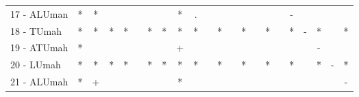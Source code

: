 \begin{table}[h]
\begin{center}
\begin{tabular}{lcc|cc|cc|cc|cc|cc|cc|cc|cc|cc|c}
17 - ALUman	& * & * &   &   &   &   &   & * & . &   &   &   &   &   &   &   & - &   &   &   &   \\
18 - TUmah	& * & * & * & * &   & * & * & * & * &   & * &   & * &   & * &   & * & - & * &   & * \\ \hline
19 - ATUmah	& * &   &   &   &   &   &   & + &   &   &   &   &   &   &   &   &   &   & - &   &   \\
20 - LUmah	& * & * & * & * &   & * & * & * & * &   & * &   & * &   & * &   & * &   & * & - & * \\ \hline
21 - ALUmah	& * & + &   &   &   &   &   & * &   &   &   &   &   &   &   &   &   &   &   &   & - \\\end{tabular}
\label{stratsALCKappaFriedIELM}
\end{center}
\end{table}